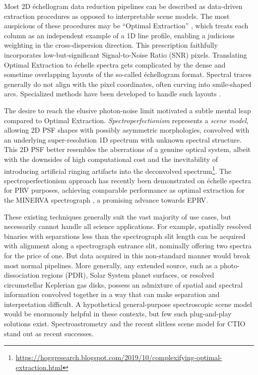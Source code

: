 \documentclass[twocolumn]{aastex631}
\begin{document}
Most 2D \'echellogram data reduction pipelines can be described as data-driven extraction procedures as opposed to interpretable scene models. The most auspicious of these procedures may be ``Optimal Extraction'' \citep{1986PASP...98..609H}, which treats each column as an independent example of a 1D line profile, enabling a judicious weighting in the cross-dispersion direction.  This prescription faithfully incorporates low-but-significant Signal-to-Noise Ratio (SNR) pixels.  Translating Optimal Extraction to \'echelle spectra gets complicated by the dense and sometime overlapping layouts of the so-called \'echellogram format.  Spectral traces generally do not align with the pixel coordinates, often curving into smile-shaped arcs.  Specialized methods have been developed to handle such layouts \citep{2002A&A...385.1095P,2014A&A...561A..59Z,2020arXiv200805827P}.

The desire to reach the elusive photon-noise limit motivated a subtle mental leap compared to Optimal Extraction.  \emph{Spectroperfectionism} \citep{2010PASP..122..248B} represents a \emph{scene model}, allowing 2D PSF shapes with possibly asymmetric morphologies, convolved with an underlying super-resolution 1D spectrum with unknown spectral structure.  This 2D PSF better resembles the aberrations of a genuine optical system, albeit with the downsides of high computational cost and the inevitability of introducing artificial ringing artifacts into the deconvolved spectrum\footnote{\url{https://hoggresearch.blogspot.com/2019/10/complexifying-optimal-extraction.html}}.  The spectroperfectionism approach has recently been demonstrated on \'echelle spectra for PRV purposes, achieving comparable performance as optimal extraction for the MINERVA spectrograph \citep{2019PASP..131l4503C}, a promising advance towards EPRV.

These existing techniques generally suit the vast majority of use cases, but necessarily cannot handle all science applications.  For example, spatially resolved binaries with separations less than the spectrograph slit length can be acquired with alignment along a spectrograph entrance slit, nominally offering two spectra for the price of one.  But data acquired in this non-standard manner would break most normal pipelines.  More generally, any extended source, such as a photo-dissociation regions (PDR), Solar System planet surfaces, or resolved circumstellar Keplerian gas disks, possess an admixture of spatial and spectral information convolved together in a way that can make separation and interpretation difficult.  A hypothetical general-purpose spectroscopic scene model would be enormously helpful in these contexts, but few such plug-and-play solutions exist.  Spectroastrometry \citep{2011ApJ...733...84P} and the recent slitless scene model for CTIO \citep{2023arXiv230704898N} stand out as recent successes.
\end{document}

